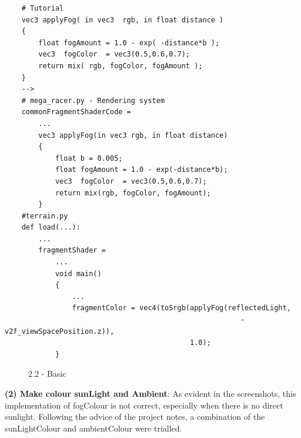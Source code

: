 \documentclass[a4 paper, 12pt]{article}
\begin{document}
    \begin{lstlisting}
    # Tutorial
    vec3 applyFog( in vec3  rgb, in float distance )
    {
        float fogAmount = 1.0 - exp( -distance*b );
        vec3  fogColor  = vec3(0.5,0.6,0.7);
        return mix( rgb, fogColor, fogAmount );
    }
    -->
    # mega_racer.py - Rendering system
    commonFragmentShaderCode = 
        ...
        vec3 applyFog(in vec3 rgb, in float distance)
        {
            float b = 0.005;
            float fogAmount = 1.0 - exp(-distance*b);
            vec3  fogColor  = vec3(0.5,0.6,0.7);
            return mix(rgb, fogColor, fogAmount);
        }
    #terrain.py
    def load(...):
        ...
        fragmentShader = 
            ...
            void main()
            {
                ...
                fragmentColor = vec4(toSrgb(applyFog(reflectedLight, 
                                                        -v2f_viewSpacePosition.z)), 
                                            1.0);
            }
    \end{lstlisting} 

\begin{figure} [H]
    \caption{2.2 - Basic}   
\end{figure}


\textbf{(2) Make colour sunLight and Ambient}: As evident in the screenshots, this implementation of fogColour is not correct, especially when there is no direct sunlight. Following the advice of the project notes, a combination of the sunLightColour and ambientColour were trialled. 
\end{document}
